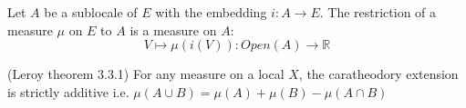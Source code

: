 \begin{lemma}
    Let $A$ be a sublocale of $E$ with the embedding $i : A \rightarrow E$. The restriction of a measure $\mu$ on $E$ to $A$ is a measure on $A$:
    $$V \mapsto \mu(i(V)) : Open(A) \to \mathbb{R}$$
    \label{lem:restriction_to_sublocale}
    \leanok
\end{lemma}

\begin{comment}
\begin{proposition}[Elementary Properties of Caratheodory Extensions]
(Leroy lemme 3.3, 3.4, Corollary 3.1, Lemme 3.5)
    \label{prop:elementary_properties_of_caratheodory_extensions}
    \uses{lem:measure_add_compl_eq_top,lem:restrict_add_compl_eq_top,lem:commutes_with_sup, lem:restrict_preserves_sSup,lem:monotonic}
    For any measure on a local $X$, the caratheodory extension satisfies the following properties:
    \begin{enumerate}
        \item It is monotonic i.e. \[A \le B \implies \mu (A) \le \mu (B)\]
        \item Commutes with unions of increasing families
        \item $\mu(U) + \mu(X \setminus U) = \mu(X)$
        \item $\mu(A) = \mu(A \cap U) + \mu(A \cap(E\setminus U))$
        \item For a increasing family $V_{\alpha}$ of open sublocals of $E$ and any sublocal $A$, we have:
        \[\mu(A \cap(\bigcup V_{\alpha})) = \sup_\alpha \mu(A\cap V_\alpha)\]
        \item For any measure on a local $X$ and a decreasing family $V_i$ of open sublocals, the caratheodory extension fulfills: $\mu (\inf V_i) = \inf \mu(V_i)$.
    \end{enumerate}
    In particular, for two open sublocals $U$ and $V$ of $X$ and any sublocal $A$ of $X$, we have
    \[\mu(A \cap (U \cup V)) = \mu(A\cap U) + \mu(A\cap V) - \mu(A \cap U \cap V)\]
\end{proposition}
\end{comment}


\begin{proposition}
(Leroy theorem 3.3.1)
    \label{prop:strictly_additive}
    For any measure on a local $X$, the caratheodory extension is
    strictly additive i.e. $\mu (A \cup B) = \mu(A) + \mu(B) - \mu(A \cap B)$
\end{proposition}


